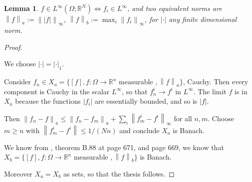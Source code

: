 \documentclass[english,a4paper,10pt,oneside]{scrbook}	%
\theoremstyle{break}
\newtheorem{lemma}[equation]{Lemma}
\newenvironment{mproof}[1][\proofname]{%
  \begin{proof}[#1]$ $\par\nobreak\ignorespaces
}{%
  \end{proof}
}
\renewcommand*{\proofname}{Proof}
\theoremstyle{remark}
\newcommand{\mR}{\mathbb{R}}
\newcommand{\norm}[1]{\left\lVert#1\right\rVert}
\begin{document}
\begin{lemma}
$f \in L^\infty(\Omega; \mR^N) \iff f_i \in L^\infty$, and two equivalent norms are $\norm{f}_a:=\norm{|f|}_\infty$, $\norm{f}_b:=\max_i\norm{f_i}_\infty$, for $|\cdot |$ any finite dimensional norm.
\end{lemma}
\begin{mproof}

We choose $|\cdot |=|\cdot|_1$.

Consider $f_n \in X_a = \{[f], f: \Omega \rightarrow \mR^n \text{ measurable }, \norm{f}_a\}$, Cauchy. Then every component is Cauchy in the scalar $L^\infty$, so that $f_n^i \rightarrow f^i $ in $L^\infty$. The limit $f$ is in $X_a$ because the functions $|f_i|$ are essentially bounded, and so is $|f|$. 

Then $\norm{f_n-f}_a\leq \norm{f_n-f_m}_a+\sum_i\norm{f_m^i-f^i}_\infty$ for all $n,m$. Choose $m\geq n$ with $\norm{f_m^i-f^i}\leq 1/(Nn)$ and conclude $X_a$ is Banach.

We know from \cite{leoni}, theorem B.88 at page 671, and page 669, we know that $X_b = \{[f], f: \Omega \rightarrow \mR^n \text{ measurable }, \norm{f}_b\}$ is Banach.

Moreover $X_a=X_b$ as sets, so that the thesis follows.


%
%
%
%
%
%

\end{mproof}
\end{document}

